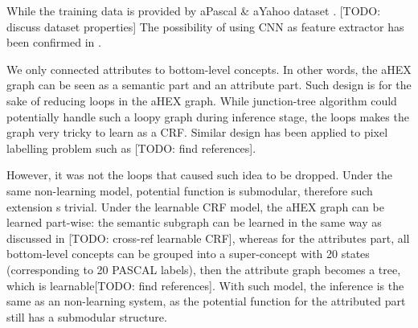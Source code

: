 \documentclass[11pt,a4paper]{article}
\begin{document}
While the training data is provided by aPascal \& aYahoo dataset \cite{farhadi2009describing}. [TODO: discuss dataset properties] The possibility of using CNN as feature extractor has been confirmed in \cite{razavian2014cnn}.

We only connected attributes to bottom-level concepts. In other words, the aHEX graph can be seen as a semantic part and an attribute part. Such design is for the sake of reducing loops in the aHEX graph. While junction-tree algorithm could potentially handle such a loopy graph during inference stage, the loops makes the graph very tricky to learn as a CRF. Similar design has been applied to pixel labelling problem such as [TODO: find references].

However, it was not the loops that caused such idea to be dropped. Under the same non-learning model, potential function is submodular, therefore such extension s trivial. Under the learnable CRF model, the aHEX graph can be learned part-wise: the semantic subgraph can be learned in the same way as discussed in [TODO: cross-ref learnable CRF], whereas for the attributes part, all bottom-level concepts can be grouped into a super-concept with 20 states (corresponding to 20 PASCAL labels), then the attribute graph becomes a tree, which is learnable[TODO: find references]. With such model, the inference is the same as an non-learning system, as the potential function for the attributed part still has a submodular structure.

\clearpage


\end{document}
